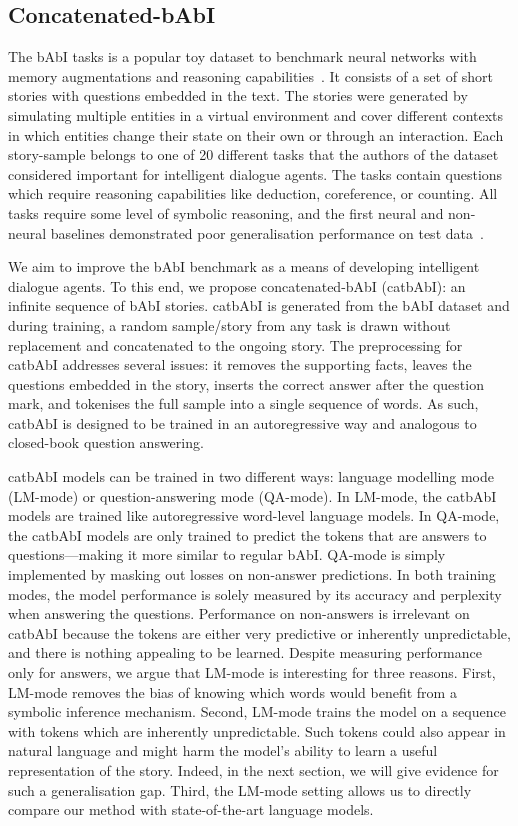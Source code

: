 \documentclass{article} \usepackage{iclr2021_conference,times}
\begin{document}
\subsection{Concatenated-bAbI}
\label{subsec:catbAbI}
The bAbI tasks is a popular toy dataset to benchmark neural networks with memory augmentations and reasoning capabilities~\citep{babi_tasks_weston}. 
It consists of a set of short stories with questions embedded in the text. 
The stories were generated by simulating multiple entities in a virtual environment and cover different contexts in which entities change their state on their own or through an interaction.
Each story-sample belongs to one of 20 different tasks that the authors of the dataset considered important for intelligent dialogue agents. 
The tasks contain questions which require reasoning capabilities like deduction, coreference, or counting.
All tasks require some level of symbolic reasoning, and the first neural and non-neural baselines demonstrated poor generalisation performance on test data~\citep{babi_tasks_weston}.

We aim to improve the bAbI benchmark as a means of developing intelligent dialogue agents.
To this end, we propose concatenated-bAbI (catbAbI): an infinite sequence of bAbI stories. 
catbAbI is generated from the bAbI dataset and during training, a random sample/story from any task is drawn without replacement and concatenated to the ongoing story. 
The preprocessing for catbAbI addresses several issues: it removes the supporting facts, leaves the questions embedded in the story, inserts the correct answer after the question mark, and tokenises the full sample into a single sequence of words. 
As such, catbAbI is designed to be trained in an autoregressive way and analogous to closed-book question answering.

catbAbI models can be trained in two different ways: language modelling mode (LM-mode) or question-answering mode (QA-mode).
In LM-mode, the catbAbI models are trained like autoregressive word-level language models. 
In QA-mode, the catbAbI models are only trained to predict the tokens that are answers to questions---making it more similar to regular bAbI. QA-mode is simply implemented by masking out losses on non-answer predictions.
In both training modes, the model performance is solely measured by its accuracy and perplexity when answering the questions.
Performance on non-answers is irrelevant on catbAbI because the tokens are either very predictive or inherently unpredictable, and there is nothing appealing to be learned. 
Despite measuring performance only for answers, we argue that LM-mode is interesting for three reasons. 
First, LM-mode removes the bias of knowing which words would benefit from a symbolic inference mechanism. 
Second, LM-mode trains the model on a sequence with tokens which are inherently unpredictable. Such tokens could also appear in natural language and might harm the model's ability to learn a useful representation of the story.
Indeed, in the next section, we will give evidence for such a generalisation gap.
Third, the LM-mode setting allows us to directly compare our method with state-of-the-art language models. 
\end{document}
